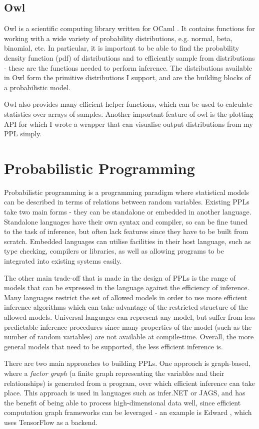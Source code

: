 \subsection{Owl}
		
Owl is a scientific computing library written for OCaml \cite{owl}. It contains functions for working with a wide variety of probability distributions, e.g. normal, beta, binomial, etc. In particular, it is important to be able to find the probability density function (pdf) of distributions and to efficiently sample from distributions - these are the functions needed to perform inference. The distributions available in Owl form the primitive distributions I support, and are the building blocks of a probabilistic model.
	
Owl also provides many efficient helper functions, which can be used to calculate statistics over arrays of samples. Another important feature of owl is the plotting API for which I wrote a wrapper that can visualise output distributions from my PPL simply.
	
\section{Probabilistic Programming}
Probabilistic programming is a programming paradigm where statistical models can be described in terms of relations between random variables. Existing PPLs take two main forms - they can be standalone or embedded in another language. Standalone languages have their own syntax and compiler, so can be fine tuned to the task of inference, but often lack features since they have to be built from scratch. Embedded languages can utilise facilities in their host language, such as type checking, compilers or libraries, as well as allowing programs to be integrated into existing systems easily.
	
The other main trade-off that is made in the design of PPLs is the range of models that can be expressed in the language against the efficiency of inference. Many languages restrict the set of allowed models in order to use more efficient inference algorithms which can take advantage of the restricted structure of the allowed models. Universal languages can represent any model, but suffer from less predictable inference procedures since many properties of the model (such as the number of random variables) are not available at compile-time. Overall, the more general models that need to be supported, the less efficient inference is.
	
There are two main approaches to building PPLs. One approach is graph-based, where a \textit{factor graph} (a finite graph representing the variables and their relationships) is generated from a program, over which efficient inference can take place. This approach is used in languages such as infer.NET or JAGS, and has the benefit of being able to process high-dimensional data well, since efficient computation graph frameworks can be leveraged - an example is Edward \cite{edward}, which uses TensorFlow as a backend.
	
